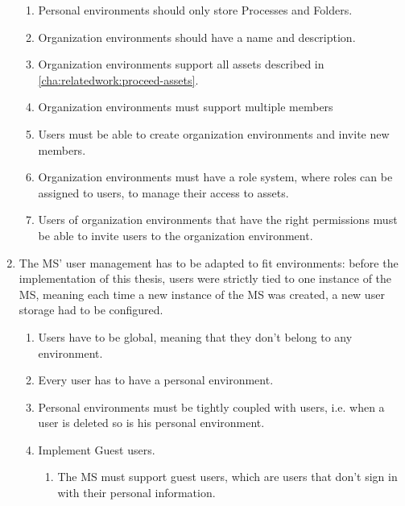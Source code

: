 \begin{enumerate}
\begin{enumerate}
		      \item Personal environments should only store Processes and Folders.

		      \item Organization environments should have a name and description.

		      \item Organization environments support all assets described in \ref{cha:relatedwork:proceed-assets}.

		      \item Organization environments must support multiple members

		      \item Users must be able to create organization environments and invite new
		            members.

		      \item Organization environments must have a role system, where roles can be assigned to
		            users, to manage their access to assets.

		      \item Users of organization environments that have the right permissions must be able to invite users
		            to the organization environment.
	      \end{enumerate}


	\item The MS' user management has to be adapted to fit environments: before the
	      implementation of this thesis, users were strictly tied to one instance of the MS,
	      meaning each time a new instance of the MS was created, a new user storage had to be
	      configured.
	      \begin{enumerate}
		      \item Users have to be global, meaning that they don't belong to any environment.

		      \item Every user has to have a personal environment.

		      \item Personal environments must be tightly coupled with users, i.e. when a user is
		            deleted so is his personal environment.

		      \item Implement Guest users.
		            \begin{enumerate}
			            \item The MS must support guest users, which are users that don't sign in with their personal
			                  information.


\end{enumerate}
\end{enumerate}
\end{enumerate}
